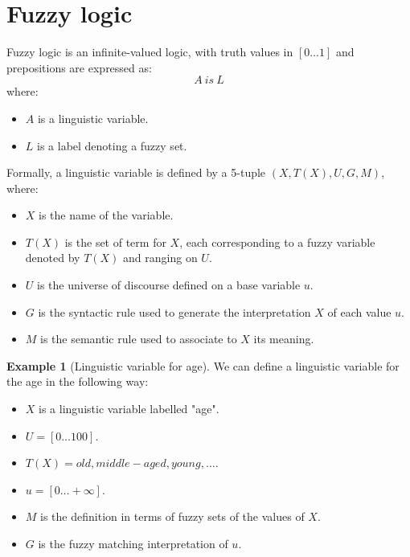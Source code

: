 \documentclass[12pt, a4paper]{report}
\theoremstyle{remark}
\theoremstyle{definition}
\newtheorem{example}{Example}
\begin{document}
    \section{Fuzzy logic}
    Fuzzy logic is an infinite-valued logic, with truth values in $[0 \dots 1]$ and prepositions are expressed as: 
    \[A \: is \: L\]
    where: 
    \begin{itemize}
        \item $A$ is a linguistic variable.
        \item $L$ is a label denoting a fuzzy set.
    \end{itemize}

    Formally, a linguistic variable is defined by a 5-tuple $(X,T(X),U,G,M)$, where: 
    \begin{itemize}
        \item $X$ is the name of the variable.
        \item $T(X)$ is the set of term for $X$, each corresponding to a fuzzy variable denoted by $T(X)$ and ranging on $U$.
        \item $U$ is the universe of discourse defined on a base variable $u$.
        \item $G$ is the syntactic rule used to generate the interpretation $X$ of each value $u$.
        \item $M$ is the semantic rule used to associate to $X$ its meaning.
    \end{itemize}
    \begin{example}[Linguistic variable for age]
        We can define a linguistic variable for the age in the following way:
        \begin{itemize}
            \item $X$ is a linguistic variable labelled "age".
            \item $U=[0 \dots 100]$.
            \item $T(X)={old, middle-aged, young, \dots}$.
            \item $u=[0 \dots +\infty]$.
            \item $M$ is the definition in terms of fuzzy sets of the values of $X$.
            \item $G$ is the fuzzy matching interpretation of $u$.
        \end{itemize}
    \end{example}
\end{document}
